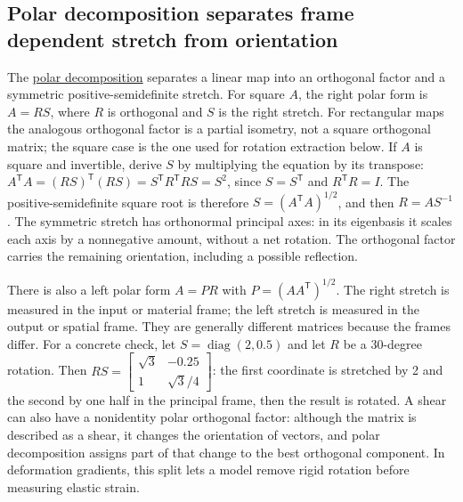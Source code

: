 \subsection{Polar decomposition separates frame dependent stretch from orientation}\label{02-foundations-ii-ch024-polar-decomposition-separates-frame-dependent-stretch-from-orientation}

\hypertarget{02-foundations-ii-ch024-polar-decomposition-separates-frame-dependent-stretch-from-orientation}{}

The \hyperref[02-foundations-ii-ch024-polar-decomposition-separates-frame-dependent-stretch-from-orientation]{polar decomposition} separates a linear map into an orthogonal factor and a symmetric positive-semidefinite stretch. For square \(A\), the right polar form is \(A=RS\), where \(R\) is orthogonal and \(S\) is the right stretch. For rectangular maps the analogous orthogonal factor is a partial isometry, not a square orthogonal matrix; the square case is the one used for rotation extraction below. If \(A\) is square and invertible, derive \(S\) by multiplying the equation by its transpose: \(A^\mathsf TA=(RS)^\mathsf T(RS)=S^\mathsf TR^\mathsf TRS=S^2\), since \(S=S^\mathsf T\) and \(R^\mathsf TR=I\). The positive-semidefinite square root is therefore \(S=(A^\mathsf TA)^{1/2}\), and then \(R=AS^{-1}\). The symmetric stretch has orthonormal principal axes: in its eigenbasis it scales each axis by a nonnegative amount, without a net rotation. The orthogonal factor carries the remaining orientation, including a possible reflection.

There is also a left polar form \(A=PR\) with \(P=(AA^\mathsf T)^{1/2}\). The right stretch is measured in the input or material frame; the left stretch is measured in the output or spatial frame. They are generally different matrices because the frames differ. For a concrete check, let \(S=\operatorname{diag}(2,0.5)\) and let \(R\) be a 30-degree rotation. Then \(RS=\begin{bmatrix}\sqrt3&-0.25\\1&\sqrt3/4\end{bmatrix}\): the first coordinate is stretched by 2 and the second by one half in the principal frame, then the result is rotated. A shear can also have a nonidentity polar orthogonal factor: although the matrix is described as a shear, it changes the orientation of vectors, and polar decomposition assigns part of that change to the best orthogonal component. In deformation gradients, this split lets a model remove rigid rotation before measuring elastic strain.

